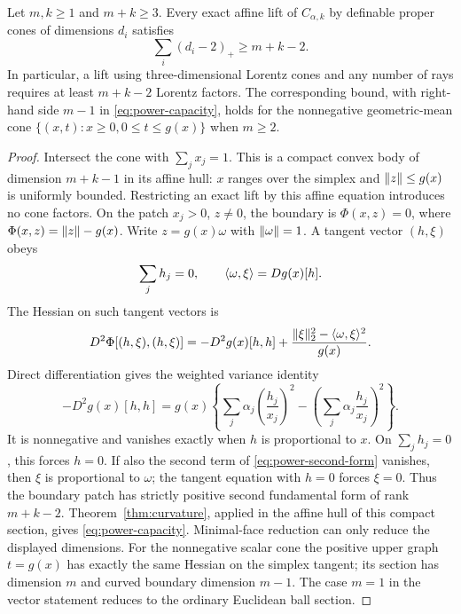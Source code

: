 \begin{theorem}\label{thm:power-capacity}
Let $m,k\geq1$ and $m+k\geq3$. Every exact affine lift of
$C_{\alpha,k}$ by definable proper cones of dimensions $d_i$ satisfies
\begin{equation}\label{eq:power-capacity}
 \sum_i(d_i-2)_+\geq m+k-2.
\end{equation}
In particular, a lift using three-dimensional Lorentz cones and any
number of rays requires at least $m+k-2$ Lorentz factors. The
corresponding bound, with right-hand side $m-1$ in
\eqref{eq:power-capacity}, holds for the nonnegative geometric-mean cone
$\{(x,t):x\geq0, 0\leq t\leq g(x)\}$ when $m\geq2$.
\end{theorem}
\begin{proof}
Intersect the cone with $\sum_jx_j=1$. This is a compact convex body
of dimension $m+k-1$ in its affine hull: $x$ ranges over the simplex
and $\lVert z\rVert\leq g(x)$ is uniformly bounded. Restricting an exact lift
by this affine equation introduces no cone factors. On the patch
$x_j>0$, $z\ne0$, the boundary is $\Phi(x,z)=0$, where
$\Phi(x,z)=\lVert z\rVert-g(x)$. Write $z=g(x)\omega$ with
$\lVert \omega\rVert=1$. A tangent vector $(h,\xi)$ obeys
\[
 \sum_jh_j=0,\qquad
 \langle \omega,\xi\rangle=Dg(x)[h].
\]
The Hessian on such tangent vectors is
\begin{equation}\label{eq:power-second-form}
 D^2\Phi[(h,\xi),(h,\xi)]
 =-D^2g(x)[h,h]
  +\frac{\lVert \xi\rVert_2^2-\langle \omega,\xi\rangle^2}{g(x)}.
\end{equation}
Direct differentiation gives the weighted variance identity
\[
 -D^2g(x)[h,h]
 =g(x)\left\{\sum_j\alpha_j\left(\frac{h_j}{x_j}\right)^2
       -\left(\sum_j\alpha_j\frac{h_j}{x_j}\right)^2\right\}.
\]
It is nonnegative and vanishes exactly when $h$ is proportional to
$x$. On $\sum_jh_j=0$, this forces $h=0$. If also the second term
of \eqref{eq:power-second-form} vanishes, then $\xi$ is proportional
to $\omega$; the tangent equation with $h=0$ forces $\xi=0$.
Thus the boundary patch has strictly positive second fundamental form
of rank $m+k-2$. Theorem~\ref{thm:curvature}, applied in the affine
hull of this compact section, gives \eqref{eq:power-capacity}.
Minimal-face reduction can only reduce the displayed dimensions.
For the nonnegative scalar cone the positive upper graph $t=g(x)$
has exactly the same Hessian on the simplex tangent; its section has
dimension $m$ and curved boundary dimension $m-1$. The case $m=1$
in the vector statement reduces to the ordinary Euclidean ball section.
\end{proof}

